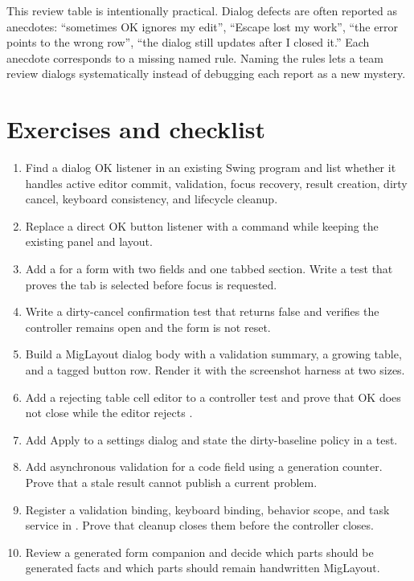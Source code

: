 This review table is intentionally practical. Dialog defects are often
reported as anecdotes: ``sometimes OK ignores my edit'', ``Escape lost my
work'', ``the error points to the wrong row'', ``the dialog still updates after
I closed it.'' Each anecdote corresponds to a missing named rule. Naming the
rules lets a team review dialogs systematically instead of debugging each
report as a new mystery.

\section{Exercises and checklist}

\begin{exercisebox}
\begin{enumerate}
\item Find a dialog OK listener in an existing Swing program and list whether
it handles active editor commit, validation, focus recovery, result creation,
dirty cancel, keyboard consistency, and lifecycle cleanup.
\item Replace a direct OK button listener with a  command while
keeping the existing panel and layout.
\item Add a  for a form with two fields and one
tabbed section. Write a test that proves the tab is selected before focus is
requested.
\item Write a dirty-cancel confirmation test that returns false and verifies
the controller remains open and the form is not reset.
\item Build a MigLayout dialog body with a validation summary, a growing table,
and a tagged button row. Render it with the screenshot harness at two sizes.
\item Add a rejecting table cell editor to a controller test and prove that OK
does not close while the editor rejects .
\item Add Apply to a settings dialog and state the dirty-baseline policy in a
test.
\item Add asynchronous validation for a code field using a generation counter.
Prove that a stale result cannot publish a current problem.
\item Register a validation binding, keyboard binding, behavior scope, and task
service in . Prove that cleanup closes them before the
controller closes.
\item Review a generated form companion and decide which parts should be
generated facts and which parts should remain handwritten MigLayout.
\end{enumerate}
\end{exercisebox}

